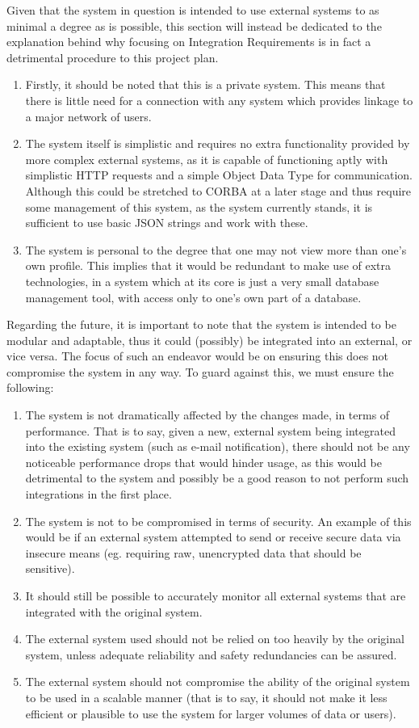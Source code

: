 \documentclass[hidelinks,a4paper,12pt]{article}
\begin{document}
	Given that the system in question is intended to use external systems to as minimal a degree as is possible, this section will instead be dedicated to the explanation behind why focusing on Integration Requirements is in fact a detrimental procedure to this project plan.
	
	\begin{enumerate}
		\item Firstly, it should be noted that this is a private system. This means that there is little need for a connection with any system which provides linkage to a major network of users.
		\item The system itself is simplistic and requires no extra functionality provided by more complex external systems, as it is capable of functioning aptly with simplistic HTTP requests and a simple Object Data Type for communication. Although this could be stretched to CORBA at a later stage and thus require some management of this system, as the system currently stands, it is sufficient to use basic JSON strings and work with these.
		\item The system is personal to the degree that one may not view more than one's own profile. This implies that it would be redundant to make use of extra technologies, in a system which at its core is just a very small database management tool, with access only to one's own part of a database.
	\end{enumerate}
	Regarding the future, it is important to note that the system is intended to be modular and adaptable, thus it could (possibly) be integrated into an external, or vice versa. The focus of such an endeavor would be on ensuring this does not compromise the system in any way. To guard against this, we must ensure the following:
	\begin{enumerate}
		\item The system is not dramatically affected by the changes made, in terms of performance. That is to say, given a new, external system being integrated into the existing system (such as e-mail notification), there should not be any noticeable performance drops that would hinder usage, as this would be detrimental to the system and possibly be a good reason to not perform such integrations in the first place.
		\item The system is not to be compromised in terms of security. An example of this would be if an external system attempted to send or receive secure data via insecure means (eg. requiring raw, unencrypted data that should be sensitive).
		\item It  should still be possible to accurately monitor all external systems that are integrated with the original system.
		\item The external system used should not be relied on too heavily by the original system, unless adequate reliability and safety redundancies can be assured.
		\item The external system should not compromise the ability of the original system to be used in a scalable manner (that is to say, it should not make it less efficient or plausible to use the system for larger volumes of data or users).
	\end{enumerate}
\end{document}
